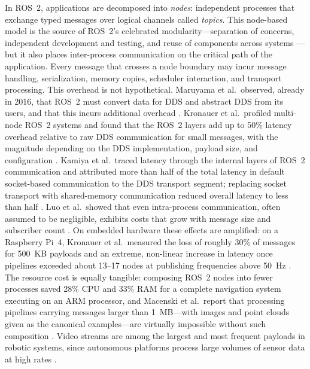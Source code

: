 In ROS~2, applications are decomposed into \emph{nodes}: independent
processes that exchange typed messages over logical channels called
\emph{topics}. This node-based model is the source of ROS~2's celebrated
modularity---separation of concerns, independent development and testing,
and reuse of components across systems \cite{macenski2022}---but it also
places inter-process communication on the critical path of the
application. Every message that crosses a node boundary may incur message
handling, serialization, memory copies, scheduler interaction, and
transport processing. This overhead is not hypothetical. Maruyama et al.\
observed, already in 2016, that ROS~2 must convert data for DDS and
abstract DDS from its users, and that this incurs additional overhead
\cite{maruyama2016}. Kronauer et al.\ profiled multi-node ROS~2 systems
and found that the ROS~2 layers add up to 50\% latency overhead relative
to raw DDS communication for small messages, with the magnitude depending
on the DDS implementation, payload size, and configuration
\cite{kronauer2021}. Kamiya et al.\ traced latency through the internal
layers of ROS~2 communication and attributed more than half of the total
latency in default socket-based communication to the DDS transport
segment; replacing socket transport with shared-memory communication
reduced overall latency to less than half \cite{kamiya2025}. Luo et al.\
showed that even intra-process communication, often assumed to be
negligible, exhibits costs that grow with message size and subscriber
count \cite{luo2025}. On embedded hardware these effects are amplified:
on a Raspberry Pi~4, Kronauer et al.\ measured the loss of roughly 30\%
of messages for 500~KB payloads and an extreme, non-linear increase in
latency once pipelines exceeded about 13--17 nodes at publishing
frequencies above 50~Hz \cite{kronauer2021}. The resource cost is
equally tangible: composing ROS~2 nodes into fewer processes saved 28\%
CPU and 33\% RAM for a complete navigation system executing on an ARM
processor, and Macenski et al.\ report that processing pipelines carrying
messages larger than 1~MB---with images and point clouds given as the
canonical examples---are virtually impossible without such composition
\cite{macenski2023}. Video streams are among the largest and
most frequent payloads in robotic systems, since autonomous platforms
process large volumes of sensor data at high rates \cite{kamiya2025}.

